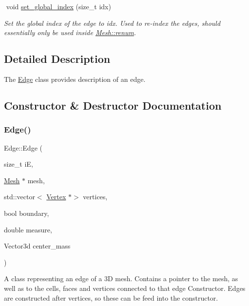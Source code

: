 \begin{DoxyCompactItemize}
$$\mbox{\label{classHArDCore3D_1_1Edge_a150b8b31cd1b608d6ce8b020227a6db2}} 
void \hyperlink{classHArDCore3D_1_1Edge_a150b8b31cd1b608d6ce8b020227a6db2}{set\+\_\+global\+\_\+index} (size\+\_\+t idx)
\begin{DoxyCompactList}\small\item\em Set the global index of the edge to idx. Used to re-\/index the edges, should essentially only be used inside \hyperlink{classHArDCore3D_1_1Mesh_af77873bbc892a7a5b37bf4773c55aefc}{Mesh\+::renum}. \end{DoxyCompactList}\end{DoxyCompactItemize}


\subsection{Detailed Description}
The \hyperlink{classHArDCore3D_1_1Edge}{Edge} class provides description of an edge. 

\subsection{Constructor \& Destructor Documentation}
\mbox{\label{classHArDCore3D_1_1Edge_a051ae1dd47537d89d8efbce3d4fd1760}} 
\subsubsection{\texorpdfstring{Edge()}{Edge()}}
{\footnotesize\ttfamily Edge\+::\+Edge (\begin{DoxyParamCaption}\item[{size\+\_\+t}]{iE,  }\item[{\hyperlink{classHArDCore3D_1_1Mesh}{Mesh} $\ast$}]{mesh,  }\item[{std\+::vector$<$ \hyperlink{classHArDCore3D_1_1Vertex}{Vertex} $\ast$$>$}]{vertices,  }\item[{bool}]{boundary,  }\item[{double}]{measure,  }\item[{Vector3d}]{center\+\_\+mass }\end{DoxyParamCaption})}

A class representing an edge of a 3D mesh. Contains a pointer to the mesh, as well as to the cells, faces and vertices connected to that edge Constructor. Edges are constructed after vertices, so these can be feed into the constructor.


